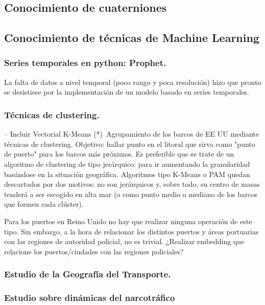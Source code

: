 \documentclass{article}
\begin{document}
\subsection{Conocimiento de cuaterniones}


\subsection{Conocimiento de técnicas de Machine Learning}


\subsubsection{Series temporales en python: Prophet.}
La falta de datos a nivel temporal (poco rango y poca resolución) hizo que pronto se desistiese por la implementación de un modelo basado en series temporales.

\subsubsection{Técnicas de clustering.}
-- Incluir Vectorial K-Means (*)\
Agrupamiento de los barcos de EE UU mediante técnicas de clustering. Objetivo: hallar punto en el litoral que sirva como "punto de puerto" para los barcos más próximos. Es preferible que se trate de un algoritmo de clustering de tipo jerárquico: para ir aumentando la granularidad basándose en la situación geográfica.
Algoritmos tipo K-Means o PAM quedan descartados por dos motivos: no son jerárquicos y, sobre todo, su centro de masas tenderá a ser escogido en alta mar (o como punto medio o mediano de los barcos que formen cada clúster).\

Para los puertos en Reino Unido no hay que realizar ninguna operación de este tipo. Sin embargo, a la hora de relacionar los distintos puertos y áreas portuarias con las regiones de autoridad policial, no es trivial. ¿Realizar embedding que relacione los puertos/ciudades con las regiones policiales?



\subsubsection{Estudio de la Geografía del Transporte.}


\subsubsection{Estudio sobre dinámicas del narcotráfico}
\end{document}
